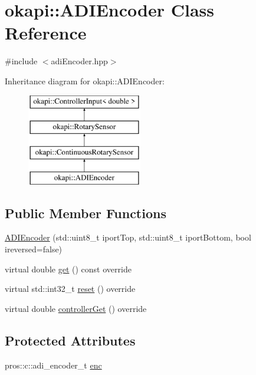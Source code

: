 \hypertarget{classokapi_1_1ADIEncoder}{}\section{okapi\+::A\+D\+I\+Encoder Class Reference}
\label{classokapi_1_1ADIEncoder}


{\ttfamily \#include $<$adi\+Encoder.\+hpp$>$}

Inheritance diagram for okapi\+::A\+D\+I\+Encoder\+:\begin{figure}[H]
\begin{center}
\leavevmode
\includegraphics[height=4.000000cm]{classokapi_1_1ADIEncoder}
\end{center}
\end{figure}
\subsection*{Public Member Functions}
\begin{DoxyCompactItemize}
\item 
\mbox{\hyperlink{classokapi_1_1ADIEncoder_ae60daf46ded27335225cc9b6522054c6}{A\+D\+I\+Encoder}} (std\+::uint8\+\_\+t iport\+Top, std\+::uint8\+\_\+t iport\+Bottom, bool ireversed=false)
\item 
virtual double \mbox{\hyperlink{classokapi_1_1ADIEncoder_a1728a39cdb3e87e7c650961f34608f75}{get}} () const override
\item 
virtual std\+::int32\+\_\+t \mbox{\hyperlink{classokapi_1_1ADIEncoder_a8df70f75e1f23aa03eaa3e331fcab381}{reset}} () override
\item 
virtual double \mbox{\hyperlink{classokapi_1_1ADIEncoder_a57358ad75caea8ddf829c40e9e42ab83}{controller\+Get}} () override
\end{DoxyCompactItemize}
\subsection*{Protected Attributes}
\begin{DoxyCompactItemize}
\item 
pros\+::c\+::adi\+\_\+encoder\+\_\+t \mbox{\hyperlink{classokapi_1_1ADIEncoder_a73a94af6c2622b5cc8c30e6f99e20b44}{enc}}
\end{DoxyCompactItemize}



